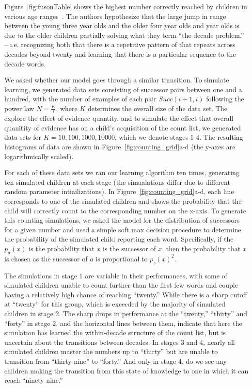 \documentclass[10pt,letterpaper]{article}
\begin{document}
Figure~\ref{fig:fusonTable} shows the highest number correctly reached
by children in various age ranges~\cite{FusRicBriar1982}. The authors
hypothesize that the large jump in range between the young three year
olds and the older four year olds and year olds is due to the older
children partially solving what they term ``the decade problem.'' --
i.e. recognizing both that there is a repetitive pattern of that
repeats across decades beyond twenty and learning that there is a
particular sequence to the decade words.

We asked whether our model goes through a similar transition. To
simulate learning, we generated data sets consisting of successor
pairs between one and a hundred, with the number of examples of each
pair $Succ(i+1, i)$ following the power law $N=\frac{K}{i}$, where $K$
determines the overall size of the data set. The explore the effect of
evidence quantity, and to simulate the effect that overall quanitity
of evidence has on a child's acquisition of the count list, we
generated data sets for $K=10, 100, 1000, 10000$, which we denote
stages 1-4. The resulting histograms of data are shown in
Figure~\ref{fig:counting_grid}a-d (the y-axes are logarithmically
scaled).

For each of these data sets we ran our learning algorithm ten times,
generating ten simulated children at each stage (the simualations
differ due to different random parameter intiailizations). In
Figure~\ref{fig:counting_grid}a-d, each line corresponds to one of the
simulated children and shows the probability that the child will
correctly count to the corresponding number on the x-axis. To generate
this counting simulations, we asked the model for the distribution of
successors for a given number and used a simple soft max decision
procedure to determine the probability of the simulated child
reporting each word. Specifically, if the $p_a(x)$ is the probability
that $x$ is the successor of $x$, then the probability that $x$ is
chosen as the successor of $a$ is proportional to $p_z(x)^2$.

The simulations in stage 1 are variable in their performances, with
some of simulated children unable to count further than the first few
words and couple having a relatively high chance of reaching
``twenty.'' While there is a sharp cutoff at ``twenty'' for this
group, which is exceeded by the majority of simulated children in
stage 2. The sharp drops in performance at the ``twenty,'' ``thirty''
and ``forty'' in stage 2, and the horizontal lines between them,
indicate that here the simulation has learned the within-decade
structure of the count list, but is uncertain about the transitions
between decades. In stages 3 and 4, nearly all simulated children
master the numbers up to ``thirty'' but are unable to transition from
``thirty-nine'' to ``forty.'' And only in stage 4, do we see any
children making the transition from this state of knowledge to one in
which it can reach ``ninety nine.'' 
\end{document}
